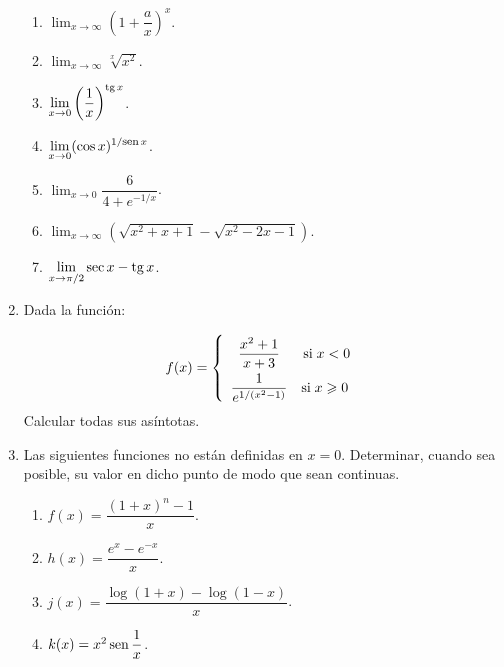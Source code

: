 \begin{enumerate}[leftmargin=*]
\begin{multicols}{2}
\begin{enumerate}
    \item $\displaystyle \lim_{x\rightarrow \infty}\left(1+\dfrac{a}{x}\right)^x$.

    \item $\displaystyle \lim_{x\rightarrow \infty} \sqrt[x]{x^2}$.

    \item $\displaystyle \lim_{x\rightarrow 0}\left(\dfrac{1}{x}\right)^{\mathop{\rm tg}\nolimits x}$.

    \item $\displaystyle \lim_{x\rightarrow 0}(\cos x)^{1/\mbox{\footnotesize sen}\, x}$.

    \item $\displaystyle \lim_{x\rightarrow 0}\dfrac{6}{4+e^{-1/x}}$.

    \item $\displaystyle \lim_{x\rightarrow
    \infty}\left(\sqrt{x^2+x+1}-\sqrt{x^2-2x-1}\right)$.

    \item $\displaystyle \lim_{x\rightarrow \pi/2}\sec x-\mathop{\rm tg}\nolimits x$.
\end{enumerate}
\end{multicols}

\item Dada la función:

\[
\renewcommand{\arraystretch}{2}
f(x) = \left\{ {\begin{array}{*{20}c}
   {\dfrac{{x^2  + 1}}
{{x + 3}}} & {\text{si}\;x < 0}  \\
   {\dfrac{1}
{{e^{1/(x^2  - 1)} }}} & {\text{si}\;x \geqslant 0\;}  \\

 \end{array} } \right.
\]
Calcular todas sus asíntotas.

\item  Las siguientes funciones no están definidas en $x=0$.
Determinar, cuando sea posible, su valor en dicho punto de modo que
sean continuas.
\begin{multicols}{2}
\begin{enumerate}
    \item  $f(x)=\dfrac{(1+x)^n-1}{x}$.

    \item  $h(x)=\dfrac{e^x-e^{-x}}{x}$.

    \item  $j(x)=\dfrac{\log(1+x)-\log(1-x)}{x}$.

    \item  $k(x)=x^2\mathop{\rm sen}\nolimits\dfrac{1}{x}$.
\end{enumerate}
\end{multicols}


\end{enumerate}












